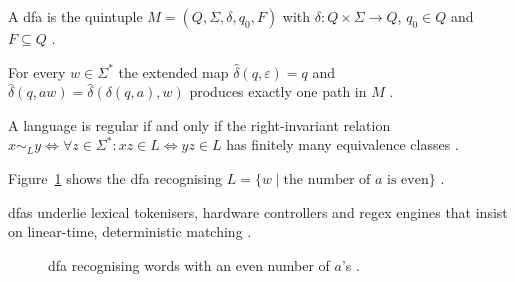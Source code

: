 \begin{definition}\label{def:dfa}
A \gls{dfa} is the quintuple
$M=(Q,\Sigma,\delta,q_{0},F)$ with
$\delta\colon Q{\times}\Sigma\to Q$,
$q_{0}\in Q$ and $F\subseteq Q$
\cite{HopcroftUllman1979}.
\end{definition}

\begin{proposition}\label{prop:dfa-path}
For every $w\in\Sigma^{\ast}$ the extended map
$\hat{\delta}(q,\varepsilon)=q$ and
$\hat{\delta}(q,aw)=\hat{\delta}(\delta(q,a),w)$
produces exactly one path in $M$
\cite{HopcroftUllman1979}.
\end{proposition}

\begin{theorem}\label{thm:mn-dfa}
A language is regular if and only if the right-invariant relation
$x\sim_{L}y\Longleftrightarrow
\forall z\in\Sigma^{\ast}\colon xz\in L\Leftrightarrow yz\in L$
has finitely many equivalence classes
\cite{Nerode1958}.
\end{theorem}

\begin{example}[Even $a$’s]\label{ex:dfa-even}
Figure~\ref{fig:dfa-even-a} shows the \gls{dfa} recognising
$L=\{w\mid \text{the number of }a\text{ is even}\}$
\cite{HopcroftUllman1979}.
\end{example}

\begin{observation}\label{obs:dfa-app}
\glspl{dfa} underlie lexical tokenisers, hardware controllers and regex
engines that insist on linear-time, deterministic matching
\cite{AhoHopcroftUllman1974}.
\end{observation}

\begin{figure}[H]
    \centering
    \caption{\gls{dfa} recognising words with an even number of $a$’s
    \cite{HopcroftUllman1979}.}
    \label{fig:dfa-even-a}
\end{figure}

